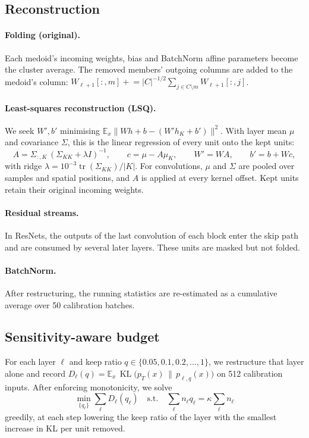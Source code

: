 \documentclass[11pt]{article}
\DeclareMathOperator{\KL}{KL}
\begin{document}
\subsection{Reconstruction}
\paragraph{Folding (original).} Each medoid's incoming weights, bias and BatchNorm affine parameters
become the cluster average. The removed members' outgoing columns are added to the medoid's column:
$W_{\ell+1}[:,m]\mathrel{+}=|C|^{-1/2}\sum_{j\in C\setminus m}W_{\ell+1}[:,j]$.

\paragraph{Least-squares reconstruction (LSQ).} We seek $W',b'$ minimising
$\mathbb{E}_x\lVert W h+b-(W'h_K+b')\rVert^2$. With layer mean $\mu$ and covariance $\Sigma$, this is the
linear regression of every unit onto the kept units:
\begin{equation}
  A=\Sigma_{:,K}\,(\Sigma_{KK}+\lambda I)^{-1},\qquad c=\mu-A\mu_K,\qquad
  W'=W A,\qquad b'=b+Wc,
\end{equation}
with ridge $\lambda=10^{-3}\operatorname{tr}(\Sigma_{KK})/|K|$. For convolutions, $\mu$ and $\Sigma$ are
pooled over samples and spatial positions, and $A$ is applied at every kernel offset. Kept units retain
their original incoming weights.

\paragraph{Residual streams.} In ResNets, the outputs of the last convolution of each block enter the skip
path and are consumed by several later layers. These units are masked but not folded.

\paragraph{BatchNorm.} After restructuring, the running statistics are re-estimated as a cumulative
average over 50 calibration batches.

\subsection{Sensitivity-aware budget}
For each layer $\ell$ and keep ratio $q\in\{0.05,0.1,0.2,\dots,1\}$, we restructure that layer alone
and record $D_\ell(q)=\mathbb{E}_x\,\KL\big(p_T(x)\,\|\,p_{\ell,q}(x)\big)$ on 512 calibration inputs.
After enforcing monotonicity, we solve
\begin{equation}
  \min_{\{q_\ell\}}\sum_\ell D_\ell(q_\ell)\quad\text{s.t.}\quad\sum_\ell n_\ell q_\ell=\kappa\sum_\ell n_\ell
\end{equation}
greedily, at each step lowering the keep ratio of the layer with the smallest increase in KL per unit
removed.
\end{document}
